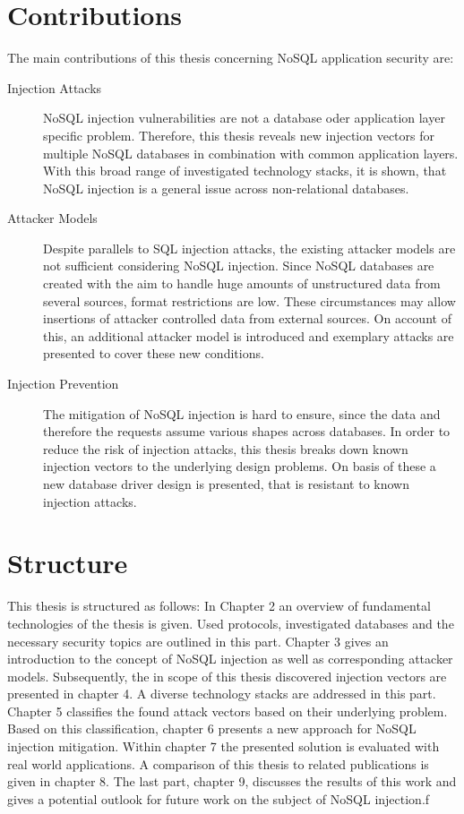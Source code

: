 \section{Contributions}

The main contributions of this thesis concerning NoSQL application security are:
\begin{description}
\item [Injection Attacks] NoSQL injection vulnerabilities are not a database oder application layer specific problem. Therefore, this thesis reveals new injection vectors for multiple NoSQL databases in combination with common application layers. With this broad range of investigated technology stacks, it is shown, that NoSQL injection is a general issue across non-relational databases.
\item [Attacker Models] Despite parallels to SQL injection attacks, the existing attacker models are not sufficient considering NoSQL injection. Since NoSQL databases are created with the aim to handle huge amounts of unstructured data from several sources, format restrictions are low. These circumstances may allow insertions of attacker controlled data from external sources. On account of this, an additional attacker model is introduced and exemplary attacks are presented to cover these new conditions.
\item [Injection Prevention] The mitigation of NoSQL injection is hard to ensure, since the data and therefore the requests assume various shapes across databases. In order to reduce the risk of injection attacks, this thesis breaks down known injection vectors to the underlying design problems. On basis of these a new database driver design is presented, that is resistant to known injection attacks.
\end{description}

\section{Structure}
This thesis is  structured as follows: In Chapter 2 an overview of fundamental technologies of the thesis is given. Used protocols, investigated databases and the necessary security topics are outlined in this part. Chapter 3 gives an introduction to the concept of NoSQL injection as well as corresponding attacker models. Subsequently, the in scope of this thesis discovered injection vectors are presented in chapter 4. A diverse technology stacks are addressed in this part. Chapter 5 classifies the found attack vectors based on their underlying problem. Based on this classification, chapter 6 presents a new approach for NoSQL injection mitigation. Within chapter 7 the presented solution is evaluated with real world applications. A comparison of this thesis to related publications is given in chapter 8. The last part, chapter 9, discusses the results of this work and gives a potential outlook for future work on the subject of NoSQL injection.f
